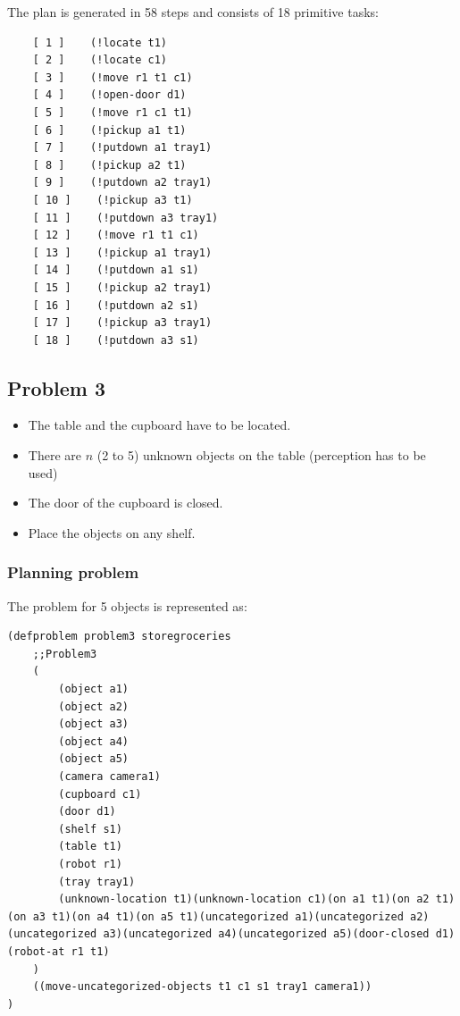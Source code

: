 \documentclass[paper=a4, fontsize=11pt]{scrartcl}
\begin{document}
	The plan is generated in 58 steps and consists of 18 primitive tasks: \\
	
	\begin{lstlisting}
	[ 1 ]    (!locate t1)
	[ 2 ]    (!locate c1)
	[ 3 ]    (!move r1 t1 c1)
	[ 4 ]    (!open-door d1)
	[ 5 ]    (!move r1 c1 t1)
	[ 6 ]    (!pickup a1 t1)
	[ 7 ]    (!putdown a1 tray1)
	[ 8 ]    (!pickup a2 t1)
	[ 9 ]    (!putdown a2 tray1)
	[ 10 ]    (!pickup a3 t1)
	[ 11 ]    (!putdown a3 tray1)
	[ 12 ]    (!move r1 t1 c1)
	[ 13 ]    (!pickup a1 tray1)
	[ 14 ]    (!putdown a1 s1)
	[ 15 ]    (!pickup a2 tray1)
	[ 16 ]    (!putdown a2 s1)
	[ 17 ]    (!pickup a3 tray1)
	[ 18 ]    (!putdown a3 s1)
	\end{lstlisting}
		
	\subsection{Problem 3}
	
		\begin{itemize}
			\item The table and the cupboard have to be located.
			\item There are $n$ (2 to 5) unknown objects on the table (perception has to be used)
			\item The door of the cupboard is closed.
			\item Place the objects on any shelf.
		\end{itemize}
	
	\subsubsection*{Planning problem}
	
	The problem for 5 objects is represented as: \\
	
	\begin{lstlisting}
(defproblem problem3 storegroceries
	;;Problem3
	(
		(object a1)
		(object a2)
		(object a3)
		(object a4)
		(object a5)
		(camera camera1)
		(cupboard c1)
		(door d1)
		(shelf s1)
		(table t1)
		(robot r1)
		(tray tray1)
		(unknown-location t1)(unknown-location c1)(on a1 t1)(on a2 t1)(on a3 t1)(on a4 t1)(on a5 t1)(uncategorized a1)(uncategorized a2)(uncategorized a3)(uncategorized a4)(uncategorized a5)(door-closed d1)(robot-at r1 t1)
	)
	((move-uncategorized-objects t1 c1 s1 tray1 camera1))
)
	\end{lstlisting}
	
\end{document}
